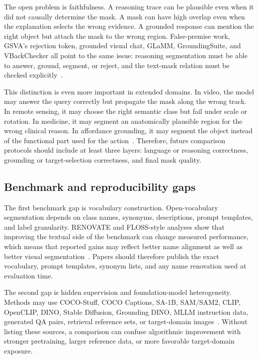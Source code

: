 The open problem is faithfulness. A reasoning trace can be plausible even when it did not causally determine the mask. A mask can have high overlap even when the explanation selects the wrong evidence. A grounded response can mention the right object but attach the mask to the wrong region. False-premise work, GSVA's rejection token, grounded visual chat, GLaMM, GroundingSuite, and VBackChecker all point to the same issue: reasoning segmentation must be able to answer, ground, segment, or reject, and the text-mask relation must be checked explicitly~\citep{wuSeeSaySegment2024,xiaGsvaGeneralizedSegmentation2024,zhangLlavagroundingGroundedVisual2024,rasheedGlammPixelGrounding2024,huGroundingSuiteMeasuringComplex2025,guoSeeingBelievingRichContext2026}.

This distinction is even more important in extended domains. In video, the model may answer the query correctly but propagate the mask along the wrong track. In remote sensing, it may choose the right semantic class but fail under scale or rotation. In medicine, it may segment an anatomically plausible region for the wrong clinical reason. In affordance grounding, it may segment the object instead of the functional part used for the action~\citep{zhengVillaVideoReasoning2025,libExploringEfficientOpenvocabulary2026,yanMedreasonerReinforcementLearning2026,wangAffordancer1ReinforcementLearning2026}. Therefore, future comparison protocols should include at least three layers: language or reasoning correctness, grounding or target-selection correctness, and final mask quality.

\subsection{Benchmark and reproducibility gaps}

The first benchmark gap is vocabulary construction. Open-vocabulary segmentation depends on class names, synonyms, descriptions, prompt templates, and label granularity. RENOVATE and FLOSS-style analyses show that improving the textual side of the benchmark can change measured performance, which means that reported gains may reflect better name alignment as well as better visual segmentation~\citep{hhuangRenovatingNamesOpenvocabulary2024,ybenigmimFlossFreeLunch2025}. Papers should therefore publish the exact vocabulary, prompt templates, synonym lists, and any name renovation used at evaluation time.

The second gap is hidden supervision and foundation-model heterogeneity. Methods may use COCO-Stuff, COCO Captions, SA-1B, SAM/SAM2, CLIP, OpenCLIP, DINO, Stable Diffusion, Grounding DINO, MLLM instruction data, generated QA pairs, retrieval reference sets, or target-domain images~\citep{liang2023ovseg,kirillov2023sam,ravi2024sam2,liu2024groundingdino,xxuanReMEDataCentricFramework2025}. Without listing these sources, a comparison can confuse algorithmic improvement with stronger pretraining, larger reference data, or more favorable target-domain exposure.

